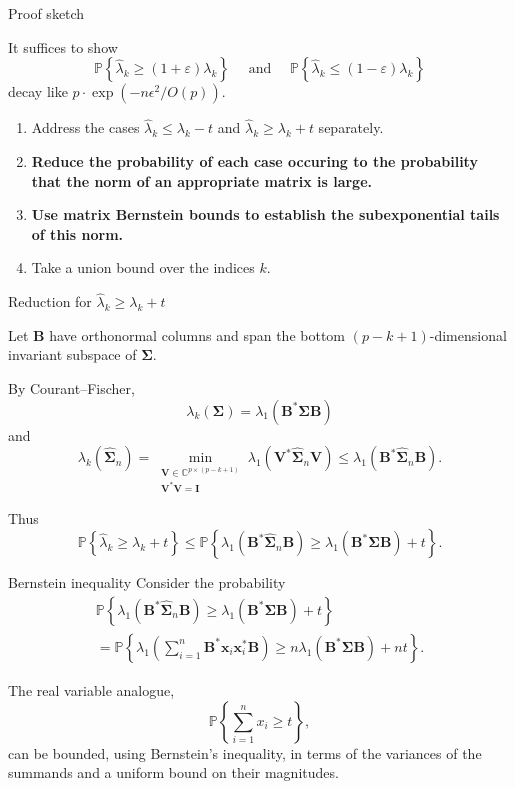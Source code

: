 \documentclass[xcolor={svgnames,pdftex,dvipsnames,table},10pt]{beamer} %
\newcommand{\mat}[1]{\ensuremath{\mathbf{#1}}}
\newcommand{\Prob}[1]{\ensuremath{\mathbb{P}\left\{#1 \right\}}}
\renewcommand{\star}{*}
\newcommand{\C}{\ensuremath{\mathbb{C}}}
\begin{document}
\begin{frame}{Proof sketch}

It suffices to show
\[
 \textstyle \Prob{\hat{\lambda}_k \geq (1+\varepsilon) \lambda_k } \quad \text{ and } \quad \Prob{\hat{\lambda}_k \leq (1-\varepsilon) \lambda_k}
\]
decay like $p\cdot \exp(-n\epsilon^2/O(p)).$

\pause
\begin{enumerate}
	\item Address the cases $\hat{\lambda}_k \leq \lambda_k -t $ and $\hat{\lambda}_k \geq \lambda_k + t$ separately. 
	
	\pause
	
	\item {\bf Reduce the probability of each case occuring to the probability that the norm of an appropriate matrix is large.}

	\pause
	
	\item {\bf Use matrix Bernstein bounds to establish the subexponential tails of this norm. }

	\pause
	
	\item Take a union bound over the indices $k.$
 \end{enumerate}
 
\end{frame}

\begin{frame}{Reduction for $\hat{\lambda}_k \geq \lambda_k + t$}

Let $\mat{B}$ have orthonormal columns and span the bottom $(p-k+1)$-dimensional invariant subspace of $\mat{\Sigma}.$

By Courant--Fischer,
\[
 \lambda_k(\mat{\Sigma}) = \lambda_1(\mat{B}^\star \mat{\Sigma} \mat{B})
\]
and
\[
\lambda_k(\widehat{\mat{\Sigma}}_n) = \min_{\substack{ \mat{V} \in \C^{p \times (p-k+1)} \\ \mat{V}^\star\mat{V}=\mat{I}}} \lambda_1(\mat{V}^\star \widehat{\mat{\Sigma}}_n\mat{V}) \leq \lambda_1(\mat{B}^\star \widehat{\mat{\Sigma}}_n \mat{B}).
\]
 
Thus 
\[
\Prob{\hat{\lambda}_k \geq \lambda_k + t } \leq \Prob{\lambda_1(\mat{B}^\star \widehat{\mat{\Sigma}}_n \mat{B}) \geq  \lambda_1(\mat{B}^\star \mat{\Sigma} \mat{B}) + t }.
\]

\end{frame}

\begin{frame}{Bernstein inequality}
 Consider the probability
\begin{multline*}
 \Prob{\lambda_1(\mat{B}^\star \widehat{\mat{\Sigma}}_n \mat{B}) \geq  \lambda_1(\mat{B}^\star \mat{\Sigma} \mat{B}) + t } \\
 = \Prob{\lambda_1\left(\sum_{i=1}^n \mat{B}^\star \mat{x}_i \mat{x}_i^\star \mat{B} \right) \geq n \lambda_1(\mat{B}^\star \mat{\Sigma} \mat{B}) + n t}.
\end{multline*}

The real variable analogue,
\[
 \Prob{ \sum_{i=1}^n x_i \geq t },
\]
can be bounded, using Bernstein's inequality, in terms of the variances of the summands and a uniform bound on their magnitudes.
\end{frame}
\end{document}
